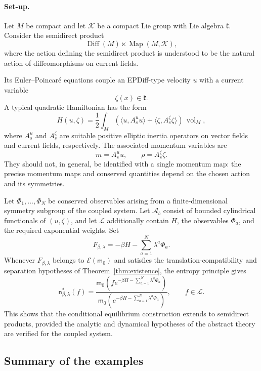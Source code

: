 \documentclass[11pt,reqno]{amsart}
\begin{document}
\paragraph{\bfseries Set-up.}
Let $M$ be compact and let $\mathcal K$ be a compact Lie group with Lie
algebra $\mathfrak k$. Consider the semidirect product
\[
\operatorname{Diff}(M)
\ltimes
\operatorname{Map}(M,\mathcal K),
\]
where the action defining the semidirect product is understood to be
the natural action of diffeomorphisms on current fields.

Its Euler--Poincaré equations couple an EPDiff-type velocity $u$ with a
current variable
\[
\zeta(x)\in\mathfrak k.
\]
A typical quadratic Hamiltonian has the form
\[
H(u,\zeta)
=
\frac12
\int_M
\left(
\langle u,A_s^{u}u\rangle
+
\langle\zeta,A_s^{\zeta}\zeta\rangle
\right)
\,\operatorname{vol}_M,
\]
where $A_s^{u}$ and $A_s^{\zeta}$ are suitable positive elliptic inertia
operators on vector fields and current fields, respectively. The
associated momentum variables are
\[
m=A_s^{u}u,
\qquad
\rho=A_s^{\zeta}\zeta.
\]
They should not, in general, be identified with a single momentum map:
the precise momentum maps and conserved quantities depend on the
chosen action and its symmetries.

Let $\Phi_1,\ldots,\Phi_N$ be conserved observables arising from a
finite-dimensional symmetry subgroup of the coupled system. Let
$\mathcal A_b$ consist of bounded cylindrical functionals of
$(u,\zeta)$, and let $\mathcal L$ additionally contain $H$, the
observables $\Phi_a$, and the required exponential weights. Set
\[
F_{\beta,\lambda}
=
-\beta H-\sum_{a=1}^{N}\lambda^a\Phi_a.
\]
Whenever $F_{\beta,\lambda}$ belongs to
$\mathcal E(\mathsf m_0)$ and satisfies the
translation-compatibility and separation hypotheses of
Theorem~\ref{thm:existence}, the entropy principle gives
\[
\boxed{
\mathsf n_{\beta,\lambda}^*(f)
=
\frac{
\mathsf m_0
\left(
f e^{-\beta H-\sum_{a=1}^{N}\lambda^a\Phi_a}
\right)
}{
\mathsf m_0
\left(
e^{-\beta H-\sum_{a=1}^{N}\lambda^a\Phi_a}
\right)
},
\qquad
f\in\mathcal L.
}
\]
This shows that the conditional equilibrium construction extends to
semidirect products, provided the analytic and dynamical hypotheses of
the abstract theory are verified for the coupled system.

\subsection{Summary of the examples}
\end{document}
